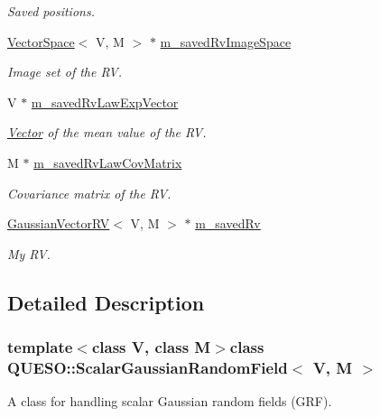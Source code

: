 \begin{DoxyCompactItemize}
\begin{DoxyCompactList}\small\item\em Saved positions. \end{DoxyCompactList}\item 
\hyperlink{class_q_u_e_s_o_1_1_vector_space}{Vector\-Space}$<$ V, M $>$ $\ast$ \hyperlink{class_q_u_e_s_o_1_1_scalar_gaussian_random_field_aaffc22808e1c4a88073a171d781412a5}{m\-\_\-saved\-Rv\-Image\-Space}
\begin{DoxyCompactList}\small\item\em Image set of the R\-V. \end{DoxyCompactList}\item 
V $\ast$ \hyperlink{class_q_u_e_s_o_1_1_scalar_gaussian_random_field_a0a59f8828711e204296d1cfb0ad6260a}{m\-\_\-saved\-Rv\-Law\-Exp\-Vector}
\begin{DoxyCompactList}\small\item\em \hyperlink{class_q_u_e_s_o_1_1_vector}{Vector} of the mean value of the R\-V. \end{DoxyCompactList}\item 
M $\ast$ \hyperlink{class_q_u_e_s_o_1_1_scalar_gaussian_random_field_aca6f26fffd99c7d8fee7a8300e623dcd}{m\-\_\-saved\-Rv\-Law\-Cov\-Matrix}
\begin{DoxyCompactList}\small\item\em Covariance matrix of the R\-V. \end{DoxyCompactList}\item 
\hyperlink{class_q_u_e_s_o_1_1_gaussian_vector_r_v}{Gaussian\-Vector\-R\-V}$<$ V, M $>$ $\ast$ \hyperlink{class_q_u_e_s_o_1_1_scalar_gaussian_random_field_ab8ca399444079041b75eb0986fe0fc80}{m\-\_\-saved\-Rv}
\begin{DoxyCompactList}\small\item\em My R\-V. \end{DoxyCompactList}\end{DoxyCompactItemize}


\subsection{Detailed Description}
\subsubsection*{template$<$class V, class M$>$class Q\-U\-E\-S\-O\-::\-Scalar\-Gaussian\-Random\-Field$<$ V, M $>$}

A class for handling scalar Gaussian random fields (G\-R\-F). 

